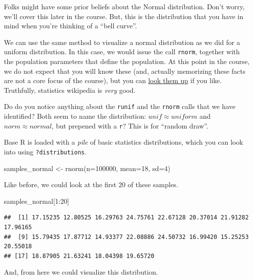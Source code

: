 \documentclass[
]{book}
\newenvironment{Shaded}{\begin{snugshade}}{\end{snugshade}}
\newcommand{\AttributeTok}[1]{\textcolor[rgb]{0.77,0.63,0.00}{#1}}
\newcommand{\DecValTok}[1]{\textcolor[rgb]{0.00,0.00,0.81}{#1}}
\newcommand{\FunctionTok}[1]{\textcolor[rgb]{0.00,0.00,0.00}{#1}}
\newcommand{\NormalTok}[1]{#1}
\newcommand{\OtherTok}[1]{\textcolor[rgb]{0.56,0.35,0.01}{#1}}
\newcommand{\SpecialCharTok}[1]{\textcolor[rgb]{0.00,0.00,0.00}{#1}}
\theoremstyle{definition}
\theoremstyle{definition}
\theoremstyle{definition}
\theoremstyle{definition}
\theoremstyle{remark}
\begin{document}
Folks might have some prior beliefs about the Normal distribution. Don't worry, we'll cover this later in the course. But, this is the distribution that you have in mind when you're thinking of a ``bell curve''.

We can use the same method to visualize a normal distribution as we did for a uniform distribution. In this case, we would issue the call \texttt{rnorm}, together with the population parameters that define the population. At this point in the course, we do not expect that you will know these (and, actually memorizing these facts are not a core focus of the course), but you can \href{https://en.wikipedia.org/wiki/Normal_distribution}{look them up} if you like. Truthfully, statistics wikipedia is \emph{very} good.

Do do you notice anything about the \texttt{runif} and the \texttt{rnorm} calls that we have identified? Both seem to name the distribution: \(unif \approx uniform\) and \(norm \approx normal\), but prepened with a \texttt{r}? This is for ``random draw''.

Base R is loaded with a \emph{pile} of basic statistics distributions, which you can look into using \texttt{?distributions}.

\begin{Shaded}
\begin{Highlighting}[]
\NormalTok{samples\_normal }\OtherTok{\textless{}{-}} \FunctionTok{rnorm}\NormalTok{(}\AttributeTok{n=}\DecValTok{100000}\NormalTok{, }\AttributeTok{mean=}\DecValTok{18}\NormalTok{, }\AttributeTok{sd=}\DecValTok{4}\NormalTok{)}
\end{Highlighting}
\end{Shaded}

Like before, we could look at the first \(20\) of these samples.

\begin{Shaded}
\begin{Highlighting}[]
\NormalTok{samples\_normal[}\DecValTok{1}\SpecialCharTok{:}\DecValTok{20}\NormalTok{]}
\end{Highlighting}
\end{Shaded}

\begin{verbatim}
##  [1] 17.15235 12.80525 16.29763 24.75761 22.67128 20.37014 21.91282 17.96165
##  [9] 15.79435 17.87712 14.93377 22.08886 24.50732 16.99420 15.25253 20.55018
## [17] 18.87905 21.63241 18.04398 19.65720
\end{verbatim}

And, from here we could visualize this distribution.
\end{document}
